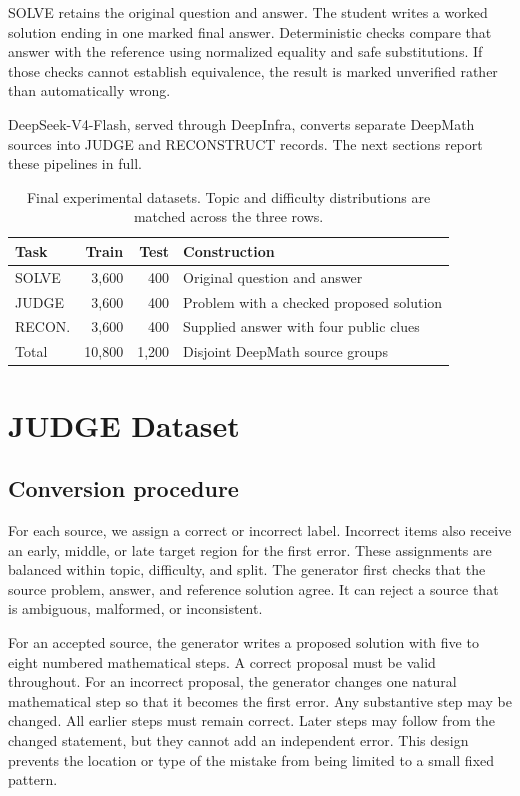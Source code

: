 \documentclass[11pt]{article}
\begin{document}
SOLVE retains the original question and answer. The student writes a worked solution ending in one marked final answer. Deterministic checks compare that answer with the reference using normalized equality and safe substitutions. If those checks cannot establish equivalence, the result is marked unverified rather than automatically wrong.

DeepSeek-V4-Flash, served through DeepInfra, converts separate DeepMath sources into JUDGE and RECONSTRUCT records. The next sections report these pipelines in full.

\begin{table}[t]
\centering
\small
\setlength{\tabcolsep}{3pt}
\begin{tabular}{lrrp{}}
\toprule
Task & Train & Test & Construction \\
\midrule
SOLVE & 3,600 & 400 & Original question and answer \\
JUDGE & 3,600 & 400 & Problem with a checked proposed solution \\
RECON. & 3,600 & 400 & Supplied answer with four public clues \\
\midrule
Total & 10,800 & 1,200 & Disjoint DeepMath source groups \\
\bottomrule
\end{tabular}
\caption{Final experimental datasets. Topic and difficulty distributions are matched across the three rows.}
\label{tab:dataset-summary}
\end{table}

\section{JUDGE Dataset}

\subsection{Conversion procedure}

For each source, we assign a correct or incorrect label. Incorrect items also receive an early, middle, or late target region for the first error. These assignments are balanced within topic, difficulty, and split. The generator first checks that the source problem, answer, and reference solution agree. It can reject a source that is ambiguous, malformed, or inconsistent.

For an accepted source, the generator writes a proposed solution with five to eight numbered mathematical steps. A correct proposal must be valid throughout. For an incorrect proposal, the generator changes one natural mathematical step so that it becomes the first error. Any substantive step may be changed. All earlier steps must remain correct. Later steps may follow from the changed statement, but they cannot add an independent error. This design prevents the location or type of the mistake from being limited to a small fixed pattern.
\end{document}
